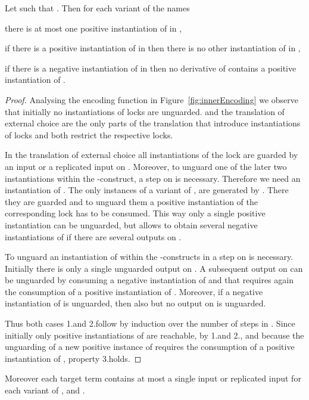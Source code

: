 \documentclass[]{eptcs}
\begin{document}
\begin{lemma}
	Let  such that . Then for each variant  of the names 
	\begin{compactenum}
		\item there is at most one positive instantiation of  in ,
		\item if there is a positive instantiation of  in  then there is no other instantiation of  in ,
		\item if there is a negative instantiation of  in  then no derivative of  contains a positive instantiation of .
	\end{compactenum}
	\label{lem:sumLocks}
\end{lemma}

\begin{proof}
	Analysing the encoding function in Figure~\ref{fig:innerEncoding} we observe that initially no instantiations of locks are unguarded.  and the translation of external choice are the only parts of the translation that introduce instantiations of locks and both restrict the respective locks.
	
	In the translation of external choice all instantiations of the lock  are guarded by an input or a replicated input on . Moreover, to unguard one of the later two instantiations within the -construct, a step on  is necessary. Therefore we need an instantiation of . The only instances of a variant of ,  are generated by . There they are guarded and to unguard them a positive instantiation of the corresponding lock has to be consumed. This way only a single positive instantiation can be unguarded, but  allows to obtain several negative instantiations of  if there are several outputs on .
	
	To unguard an instantiation of  within the -constructs in  a step on  is necessary. Initially there is only a single unguarded output on . A subsequent output on  can be unguarded  by consuming a negative instantiation of  and that requires again the consumption of a positive instantiation of . Moreover, if a negative instantiation of  is unguarded, then also  but no output on  is unguarded.
	
	Thus both cases 1.\@ and 2.\@ follow by induction over the number of steps in . Since initially only positive instantiations of  are reachable, by 1.\@ and 2., and because the unguarding of a new positive instance of  requires the consumption of a positive instantiation of , property 3.\@ holds.
\end{proof}

Moreover each target term contains at most a single input or replicated input for each variant of , and .
\end{document}
